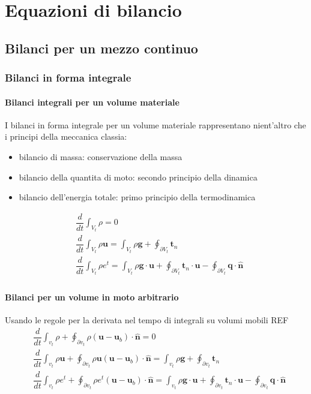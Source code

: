 
\chapter{Equazioni di bilancio}
\section{Bilanci per un mezzo continuo}
\subsection{Bilanci in forma integrale}
\subsubsection{Bilanci integrali per un volume materiale}
I bilanci in forma integrale per un volume materiale rappresentano nient'altro che i principi della meccanica classia:
\begin{itemize}
    \item bilancio di massa: conservazione della massa
    \item bilancio della quantita di moto: secondo principio della dinamica
    \item bilancio dell'energia totale: primo principio della termodinamica
\end{itemize}
\begin{equation}
\begin{aligned}
    & \dfrac{d}{dt} \int_{V_t} \rho = 0 \\ 
    & \dfrac{d}{dt} \int_{V_t} \rho \mathbf{u} = \int_{V_t} \rho \mathbf{g} + \oint_{\partial V_t} \mathbf{t}_n \\
    & \dfrac{d}{dt} \int_{V_t} \rho e^t = \int_{V_t} \rho \mathbf{g} \cdot \mathbf{u} + \oint_{\partial V_t} \mathbf{t}_n \cdot \mathbf{u} - \oint_{\partial V_t} \mathbf{q} \cdot \mathbf{\hat{n}} \\
\end{aligned}
\end{equation}
\subsubsection{Bilanci per un volume in moto arbitrario}
Usando le regole per la derivata nel tempo di integrali su volumi mobili {\color{red} REF}
\begin{equation}
\begin{aligned}
    & \dfrac{d}{dt} \int_{v_t} \rho + \oint_{\partial v_t} \rho (\mathbf{u}- \mathbf{u}_b) \cdot \mathbf{\hat{n}} = 0 \\ 
    & \dfrac{d}{dt} \int_{v_t} \rho \mathbf{u} + \oint_{\partial v_t} \rho \mathbf{u} (\mathbf{u}- \mathbf{u}_b) \cdot \mathbf{\hat{n}} = \int_{v_t} \rho \mathbf{g} + \oint_{\partial v_t} \mathbf{t}_n \\
    & \dfrac{d}{dt} \int_{v_t} \rho e^t + \oint_{\partial v_t} \rho e^t (\mathbf{u}- \mathbf{u}_b) \cdot \mathbf{\hat{n}} = \int_{v_t} \rho \mathbf{g} \cdot \mathbf{u} + \oint_{\partial v_t} \mathbf{t}_n \cdot \mathbf{u} - \oint_{\partial v_t} \mathbf{q} \cdot \mathbf{\hat{n}} \\
\end{aligned}
\end{equation}
